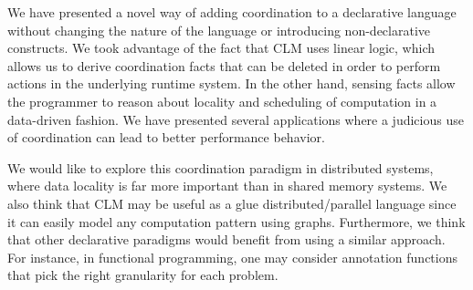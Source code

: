 We have presented a novel way of adding coordination to a declarative language without
changing the nature of the language or introducing non-declarative constructs. We
took advantage of the fact that CLM uses linear logic, which allows us to derive
coordination facts that can be deleted in order to perform actions in the underlying
runtime system. In the other hand, sensing facts allow the programmer to reason
about locality and scheduling of computation in a data-driven fashion.
We have presented several applications where a judicious use of coordination can lead to
better performance behavior.

We would like to explore this coordination paradigm in distributed systems,
where data locality is far more important than in shared memory systems. We also
think that CLM may be useful as a glue distributed/parallel language since it can
easily model any computation pattern using graphs. Furthermore, we think that
other declarative paradigms would benefit from using a similar approach. For
instance, in functional programming, one may consider annotation functions that
pick the right granularity for each problem.
